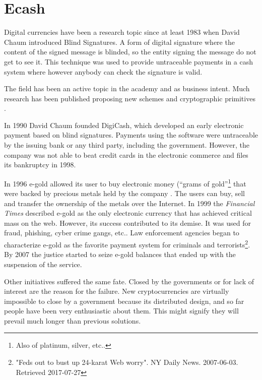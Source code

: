 \section{Ecash}
Digital currencies have been a research topic since at least 1983 when David
  Chaum\cite{chaum1983blind} introduced Blind Signatures. A form of digital
  signature where the content of the signed message is blinded, so the entity
  signing the message do not get to see it. This technique was used to provide
  untraceable payments in a cash system where however anybody can check the
  signature is valid.

The field has been an active topic in the academy and as business intent.
  Much research has been published proposing new schemes and
  cryptographic primitives \cite{okamoto1991universal}\cite{chaum1992achieving}
  \cite{boly1994esprit}\cite{anderson1996netcard}\cite{lysyanskaya1998group}.

In 1990 David Chaum founded DigiCash, which developed an early electronic
  payment based on blind signatures. Payments using the software were
  untraceable by the issuing bank or any third party, including the government.
However, the company was not able to beat credit cards in the electronic
  commerce and files its bankruptcy in 1998.

In 1996 e-gold allowed its user to buy electronic money (``grams of
  gold''\footnote{Also of platinum, silver, etc..} that were backed by precious
  metals held by the company \cite{hughes2007developments}.
The users can buy, sell and transfer the ownership of the metals over the
  Internet. In 1999 the \textit{Financial Times} described e-gold as the only
  electronic currency that has achieved critical mass on the web.
However, its success contributed to its demise. It was used for fraud, phishing,
  cyber crime gangs, etc.. Law enforcement agencies began to characterize
  e-gold as the favorite payment system for criminals and terrorists\footnote{
  "Feds out to bust up 24-karat Web worry". NY Daily News. 2007-06-03. Retrieved
  2017-07-27}. By 2007 the justice started to seize e-gold balances that ended up
  with the suspension of the service.

Other initiatives suffered the same fate.
Closed by the governments or for lack of interest are the reason for the
  failure.
New cryptocurrencies are virtually impossible to close by a government because
  its distributed design, and so far people have been very enthusiastic about
  them.
This might signify they will prevail much longer than previous solutions.
